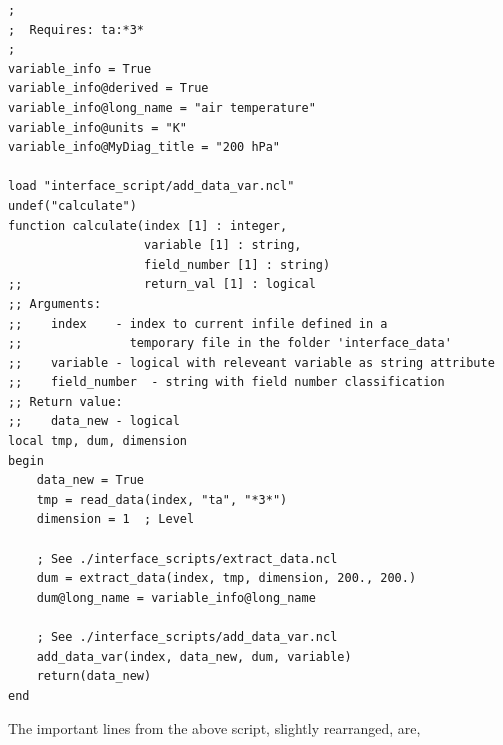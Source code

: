 \documentclass[12pt]{article}
\begin{document}
\begin{Verbatim}[frame=single, fontsize=\footnotesize]
;
;  Requires: ta:*3*
;
variable_info = True
variable_info@derived = True
variable_info@long_name = "air temperature"
variable_info@units = "K"
variable_info@MyDiag_title = "200 hPa"

load "interface_script/add_data_var.ncl"
undef("calculate")
function calculate(index [1] : integer,
                   variable [1] : string,
                   field_number [1] : string)
;;                 return_val [1] : logical
;; Arguments:
;;    index    - index to current infile defined in a
;;               temporary file in the folder 'interface_data'
;;    variable - logical with releveant variable as string attribute
;;    field_number  - string with field number classification
;; Return value:
;;    data_new - logical
local tmp, dum, dimension
begin
    data_new = True
    tmp = read_data(index, "ta", "*3*")
    dimension = 1  ; Level

    ; See ./interface_scripts/extract_data.ncl
    dum = extract_data(index, tmp, dimension, 200., 200.)
    dum@long_name = variable_info@long_name

    ; See ./interface_scripts/add_data_var.ncl
    add_data_var(index, data_new, dum, variable)
    return(data_new)
end
\end{Verbatim}
The important lines from the above script, slightly rearranged, are, 
\end{document}
